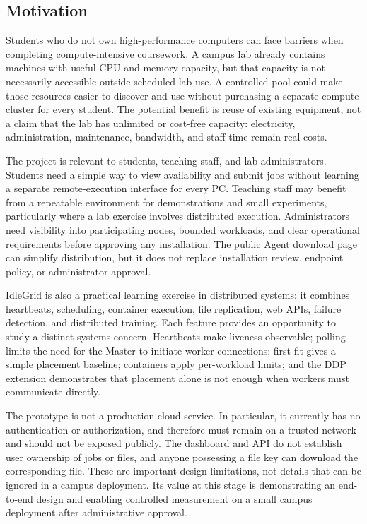 \documentclass{article}
\begin{document}
	
	\subsection{Motivation}

Students who do not own high-performance computers can face barriers when completing compute-intensive coursework. A campus lab already contains machines with useful CPU and memory capacity, but that capacity is not necessarily accessible outside scheduled lab use. A controlled pool could make those resources easier to discover and use without purchasing a separate compute cluster for every student. The potential benefit is reuse of existing equipment, not a claim that the lab has unlimited or cost-free capacity: electricity, administration, maintenance, bandwidth, and staff time remain real costs.

The project is relevant to students, teaching staff, and lab administrators. Students need a simple way to view availability and submit jobs without learning a separate remote-execution interface for every PC. Teaching staff may benefit from a repeatable environment for demonstrations and small experiments, particularly where a lab exercise involves distributed execution. Administrators need visibility into participating nodes, bounded workloads, and clear operational requirements before approving any installation. The public Agent download page can simplify distribution, but it does not replace installation review, endpoint policy, or administrator approval.

IdleGrid is also a practical learning exercise in distributed systems: it combines heartbeats, scheduling, container execution, file replication, web APIs, failure detection, and distributed training. Each feature provides an opportunity to study a distinct systems concern. Heartbeats make liveness observable; polling limits the need for the Master to initiate worker connections; first-fit gives a simple placement baseline; containers apply per-workload limits; and the DDP extension demonstrates that placement alone is not enough when workers must communicate directly.

The prototype is not a production cloud service. In particular, it currently has no authentication or authorization, and therefore must remain on a trusted network and should not be exposed publicly. The dashboard and API do not establish user ownership of jobs or files, and anyone possessing a file key can download the corresponding file. These are important design limitations, not details that can be ignored in a campus deployment. Its value at this stage is demonstrating an end-to-end design and enabling controlled measurement on a small campus deployment after administrative approval.
\end{document}
